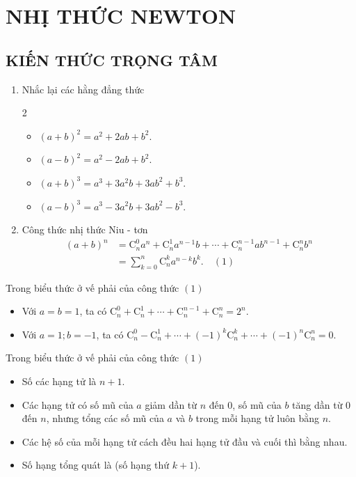 \setcounter{section}{24}
\section{NHỊ THỨC NEWTON}
\subsection{KIẾN THỨC TRỌNG TÂM}
\begin{enumerate}
	\item Nhắc lại các hằng đẳng thức
	\begin{multicols}{2}
		\begin{itemize}
			\item $(a+b)^2=a^2+2ab+b^2$.
			\item $(a-b)^2=a^2-2ab+b^2$.
			\item $(a+b)^3=a^3+3a^2b+3ab^2+b^3$.
			\item $(a-b)^3=a^3-3a^2b+3ab^2-b^3$.
		\end{itemize}
	\end{multicols}
	\item Công thức nhị thức Niu - tơn
	\begin{align*}
		\left(a+b\right)^n &=\mathrm{C}_n^0a^n+\mathrm{C}_n^1{a}^{n-1}b+\cdots+\mathrm{C}_n^{n-1}a{b}^{n-1} +\mathrm{C}_n^nb^n \\
		&=\displaystyle \sum\limits_{k=0}^n{\mathrm{C}_n^k{a}^{n-k}b^k. \quad (1)}
	\end{align*}
\end{enumerate}
\begin{note}
	Trong biểu thức ở vế phải của công thức $(1)$
	\begin{itemize}
		\item Với $a=b=1$, ta có \quad $\mathrm{C}_n^0+\mathrm{C}_n^1+\cdots+\mathrm{C}_n^{n-1}+\mathrm{C}_n^n=2^n$.
		\item Với $a=1;  b=-1$, ta có \quad $\mathrm{C}_n^0-\mathrm{C}_n^1+\cdots+{\left(-1\right)}^k\mathrm{C}_n^k+\cdots+{\left(-1\right)}^n\mathrm{C}_n^n=0$.
	\end{itemize}
\end{note}
\begin{note}
	Trong biểu thức ở vế phải của công thức $(1)$
	\begin{itemize}
		\item Số các hạng tử là $n+1$.
		\item Các hạng tử có số mũ của $a$ giảm dần từ $n$ đến $0$, số mũ của $b$ tăng dần từ $0$ đến $n$, nhưng tổng các số mũ của $a$ và $b$ trong mỗi hạng tử luôn bằng $n$.
		\item Các hệ số của mỗi hạng tử cách đều hai hạng tử đầu và cuối thì bằng nhau.
		\item Số hạng tổng quát là  (số hạng thứ $k+1$).
	\end{itemize}
\end{note}
